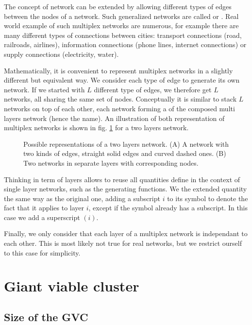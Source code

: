 \documentclass[
11pt, %
english, %
singlespacing, %
nolistspacing, %
liststotoc, %
headsepline, %
]{MastersDoctoralThesis} %
\begin{document}
The concept of network can be extended by allowing different types of edges between the nodes of a network. Such generalized networks are called  or . Real world example of such multiplex networks are numerous, for example there are many different types of connections between cities: transport connections (road, railroads, airlines), information connections (phone lines, internet connections) or supply connections (electricity, water).

Mathematically, it is convenient to represent multiplex networks in a slightly different but equivalent way. We consider each type of edge to generate its own network. If we started with $L$ different type of edges, we therefore get $L$ networks, all sharing the same set of nodes. Conceptually it is similar to stack $L$ networks on top of each other, each network forming a  of the composed multi layers network (hence the name). An illustration of both representation of multiplex networks is shown in fig. \ref{Figure: Representations of multiplex networks} for a two layers network.

\begin{figure}
	
	\caption{Possible representations of a two layers network. (A) A network with two kinds of edges, straight solid edges and curved dashed ones. (B) Two networks in separate layers with corresponding nodes.}
	\label{Figure: Representations of multiplex networks}
\end{figure}

Thinking in term of layers allows to reuse all quantities define in the context of single layer networks, such as the generating functions. We the extended quantity the same way as the original one, adding a subscript $i$ to its symbol to denote the fact that it applies to layer $i$, except if the symbol already has a subscript. In this case we add a superscript $(i)$.

Finally, we only consider that each layer of a multiplex network is independant to each other. This is most likely not true for real networks, but we restrict ourself to this case for simplicity.

\section{Giant viable cluster}

\subsection{Size of the GVC}
\label{Section: Giant Viable Cluster}
\end{document}
